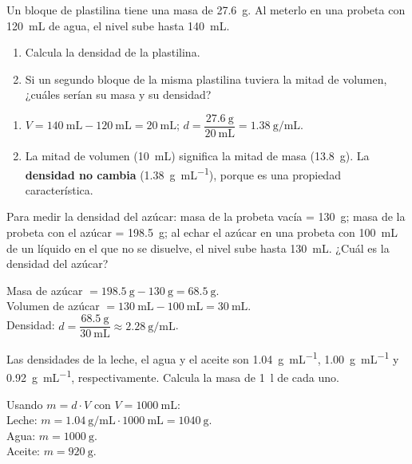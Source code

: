 \begin{exercise}
    Un bloque de plastilina tiene una masa de \qty{27.6}{\g}. Al meterlo en una probeta con \qty{120}{\mL} de agua, el nivel sube hasta \qty{140}{\mL}.
    \begin{enumerate}[label=\letraminuscula]
        \item Calcula la densidad de la plastilina.
        \item Si un segundo bloque de la misma plastilina tuviera la mitad de volumen, ¿cuáles serían su masa y su densidad?
    \end{enumerate}
    \begin{solu}
        \begin{enumerate}[label=\alph*)]
            \item \(V = \qty{140}{\mL} - \qty{120}{\mL} = \qty{20}{\mL}\); \(d = \dfrac{\qty{27.6}{\g}}{\qty{20}{\mL}} = \qty{1.38}{\g\per\mL}\).
            \item La mitad de volumen (\qty{10}{\mL}) significa la mitad de masa (\qty{13.8}{\g}). La \textbf{densidad no cambia} (\qty{1.38}{\g\per\mL}), porque es una propiedad característica.
        \end{enumerate}
    \end{solu}
\end{exercise}

\begin{exercise}
    Para medir la densidad del azúcar: masa de la probeta vacía = \qty{130}{\g}; masa de la probeta con el azúcar = \qty{198.5}{\g}; al echar el azúcar en una probeta con \qty{100}{\mL} de un líquido en el que no se disuelve, el nivel sube hasta \qty{130}{\mL}. ¿Cuál es la densidad del azúcar?
    \begin{solu}
        Masa de azúcar \(= \qty{198.5}{\g} - \qty{130}{\g} = \qty{68.5}{\g}\). \\
        Volumen de azúcar \(= \qty{130}{\mL} - \qty{100}{\mL} = \qty{30}{\mL}\). \\
        Densidad: \(d = \dfrac{\qty{68.5}{\g}}{\qty{30}{\mL}} \approx \qty{2.28}{\g\per\mL}\).
    \end{solu}
\end{exercise}

\begin{exercise}
    Las densidades de la leche, el agua y el aceite son \qty{1.04}{\g\per\mL}, \qty{1.00}{\g\per\mL} y \qty{0.92}{\g\per\mL}, respectivamente. Calcula la masa de \qty{1}{\litre} de cada uno.
    \begin{solu}
        Usando \(m = d \cdot V\) con \(V = \qty{1000}{\mL}\): \\
        Leche: \(m = \qty{1.04}{\g\per\mL} \cdot \qty{1000}{\mL} = \qty{1040}{\g}\). \\
        Agua: \(m = \qty{1000}{\g}\). \\
        Aceite: \(m = \qty{920}{\g}\).
    \end{solu}
\end{exercise}

